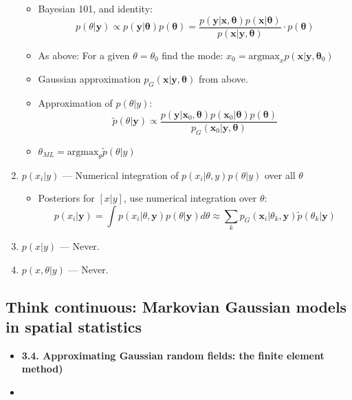 \documentclass{article}
\begin{document}
\begin{enumerate}
\begin{itemize}
      \item Bayesian 101, and identity: $$p(\theta|\pmb{y}) \propto p(\pmb{y}|\pmb{\theta})p(\pmb{\theta}) = \frac{p(\pmb{y} | \pmb{x}, \pmb{\theta}) p(\pmb{x} | \pmb{\theta})}{p(\pmb{x} | \pmb{y}, \pmb{\theta})} \cdot p(\pmb{\theta})$$
      \item As above: For a given $\theta = \theta_{0}$ find the mode: $x_{0} = \text{argmax}_{x}p(\pmb{x}|\pmb{y},\pmb{\theta}_{0})$ 
      \item Gaussian approximation $p_{G}(\pmb{x} | \pmb{y}, \pmb{\theta})$ from above.
      \item Approximation of $p(\theta|y)$:
      $$\tilde{p}(\theta|\pmb{y}) \propto  \frac{p(\pmb{y} | \pmb{x}_{0}, \pmb{\theta}) p(\pmb{x}_{0} | \pmb{\theta})p(\pmb{\theta})}{p_{G}(\pmb{x}_{0} | \pmb{y}, \pmb{\theta})}$$
      \item $\theta_{ML} = \text{argmax}_{\theta} \tilde{p}(\theta|y)$
      \end{itemize}
\item $p(x_{i}|y)$ --- Numerical integration of $p(x_{i}|\theta, y)p(\theta |y)$ over all $\theta$
      \begin{itemize}
      \item Posteriors for $[x | y]$, use numerical integration over $\theta$:
$$ p(x_{i}|\pmb{y}) = \int p(x_{i}|\theta, \pmb{y})p(\theta|\pmb{y})d\theta \approx \sum_{k} p_{G}(\pmb{x}_{i} | \theta_{k}, \pmb{y}) \tilde{p}(\theta_{k}|\pmb{y})$$
      \end{itemize}
\item $p(x|y)$ --- Never.
\item $p(x,\theta | y)$ --- Never.

\end{enumerate}

\subsection*{Think continuous: Markovian Gaussian models in spatial statistics }
\citep{Simpson2012}
\begin{itemize}
\item {\bf 3.4. Approximating Gaussian random fields: the finite element method)}
\item
\end{itemize}
\end{document}
